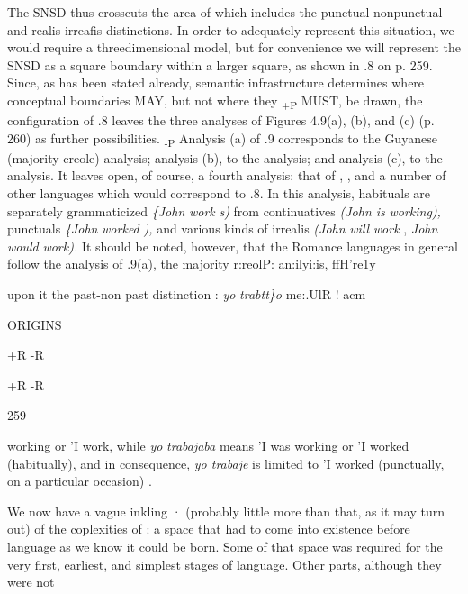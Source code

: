 The SNSD thus crosscuts the area of  which includes the punctual-nonpunctual and realis-irreafis distinctions. In order to adequately represent this situation, we would require a three\-dimensional model, but for convenience we will represent the SNSD as a square boundary within a larger square, as shown in .8 on
p. 259. Since, as has been stated already, semantic infrastructure
determines where conceptual boundaries MAY, but not where they \textsubscript{+P }MUST, be drawn, the configuration of .8 leaves the three
analyses of Figures 4.9(a), (b), and (c) (p. 260) as further possibilities. \textsubscript{{}-}\textsubscript{P}
Analysis (a) of .9 corresponds to the Guyanese (majority creole) analysis; analysis (b), to the  analysis; and analysis (c), to the  analysis. It leaves open, of course, a fourth analysis: that of , , and a number of other languages which would correspond to .8. In this analysis, habituals are separately grammaticized \textit{\{John} \textit{work} \textit{s)} from continua\-tives \textit{(John is} \textit{workin}\textit{g}\textit{), }punctuals \textit{\{John} \textit{worked} \textit{), }and various kinds of irrealis \textit{(John} \textit{will} \textit{work} , \textit{John} \textit{would} \textit{wor}\textit{k}\textit{).} It should be noted, however, that the Romance languages in general follow the analysis of .9(a), the majority r:reolP: an:ilyi:is, ffH're1y   

upon it the past-non past distinction :  \textit{yo }\textit{trabtt\}o }me:.UlR ! acm

ORIGINS

+R -R 

+R -R

259

working or 'I work, while \textit{yo} \textit{trabajaba} means 'I was working or 'I worked (habitually), and in consequence, \textit{yo trabaje} is limited to 'I worked (punctually, on a particular occasion) .

We now have a vague inkling · (probably little more than that, as it may turn out) of the coplexities of : a space that had to come into existence before language as we know it could be born. Some of that space was required for the very first, earliest, and simplest stages of language. Other parts, although they were not


